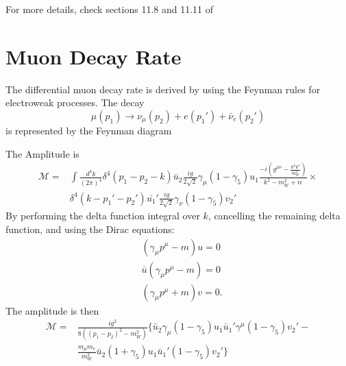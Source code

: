\documentclass{outhesis}
\begin{document}
For more details, check sections 11.8 and 11.11 of %


 \chapter{Muon Decay Rate}
 \label{app:muon}
 
 
The differential muon decay rate is derived by using the Feynman rules for electroweak processes. The decay
\begin{equation}
\mu\left(p_1\right) \to \nu_{\mu}\left(p_2 \right) + e\left(p_1' \right) + \bar{\nu}_e\left(p_2' \right)
\label{eq:mudecay}
\end{equation}
 is represented by the Feynman diagram
\begin{figure}
  \centering
\end{figure}
The Amplitude is 
\begin{equation}
\begin{split}
\mathcal{M} = &\int \frac{d^4k}{\left(2\pi\right)^4}\delta^4\left(p_1-p_2-k\right)\bar{u}_2\frac{ig}{2\sqrt{2}}\gamma_{\mu}\left(1-\gamma_5\right)u_1 \frac{-i\left(g^{\mu\nu}-\frac{k^{\mu}k^{\nu}}{m_W^2}
\right)}{k^2-m_W^2+i\epsilon}\times \\& \delta^4\left(k-p_1'-p_2'\right)\bar{u_1}' \frac{ig}{2\sqrt{2}}\gamma_{\nu}\left(1-\gamma_5 \right)v_2'
\label{eq:muM}
\end{split}
\end{equation}
By performing the delta function integral over $k$, cancelling the remaining delta function, and using the Dirac equations:
\begin{equation*}
\begin{split}
&\left(\gamma_{\mu}p^{\mu}-m  \right) u = 0 \\
& \bar{u} \left(\gamma_{\mu}p^{\mu}-m  \right)   = 0 \\
&\left(\gamma_{\mu}p^{\mu}+m  \right) v = 0 .
\end{split}
\end{equation*}
The amplitude is then 
\begin{equation}
\begin{split}
\mathcal{M} = &\frac{ig^2}{8\left(\left(p_1-p_2 \right)^2-m_W^2 \right)} \{\bar{u}_2 \gamma_{\mu}\left(1-\gamma_5\right)u_1\bar{u}_1'\gamma^{\mu}\left(1-\gamma_5 \right)v_2'- \\
&  \frac{m_{\mu}m_e}{m_W^2}\bar{u}_2\left(1+\gamma_5\right)u_1\bar{u}_1'\left(1-\gamma_5 \right)v_2'   \}
\label{eq:muM2}
\end{split}
\end{equation}
\end{document}
